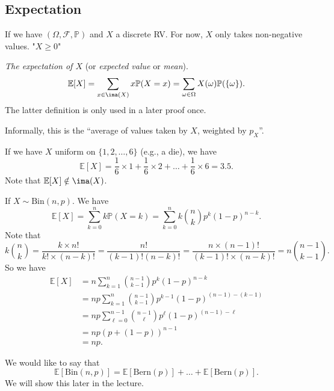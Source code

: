 \subsection{Expectation}
If we have \((\Omega, \mathcal{F}, \mathbb{P})\) and \(X\) a discrete RV. For now, \(X\) only takes non-negative values. "\(X\geq 0\)"
\begin{definition}{}{}
    \textit{The expectation of \(X\)} (or \textit{expected value} or \textit{mean}).
    \[
        \mathbb{E}[X] = \sum_{x\in \ima(X)} x \mathbb{P}(X = x) = \sum_{\omega \in\Omega}X(\omega)\mathbb{P}(\{\omega\}).
    \]
    The latter definition is only used in a later proof once.
\end{definition}
\begin{remark}
    Informally, this is the ``average of values taken by \(X\), weighted by \(p_X\)''.
\end{remark}
\begin{example}
    If we have \(X\) uniform on \(\{1, 2, \dots, 6\}\) (e.g., a die), we have
    \[
        \mathbb{E}[X] = \frac{1}{6}\times 1 + \frac{1}{6} \times 2 + \dots + \frac{1}{6} \times 6 = 3.5.
    \]
    Note that \(\mathbb{E}[X] \notin \ima(X)\).
\end{example}
\begin{example}
    If \(X \sim \mathrm{Bin}(n,p)\). We have
    \[
        \mathbb{E}[X] = \sum_{k=0}^{n} k \mathbb{P}(X = k) = \sum_{k=0}^{n} k\binom{n}{k}p^k(1-p)^{n-k}.
    \]
    Note that
    \[
        k\binom{n}{k}= \frac{k \times n!}{k! \times (n - k)!} = \frac{n!}{(k-1)!(n-k)!} = \frac{n \times (n - 1)!}{(k-1)! \times (n-k)!} = n \binom{n-1}{k-1}.
    \]
    So we have
    \begin{align*}
        \mathbb{E}[X] &= n \sum_{k=1}^{n} \binom{n - 1}{k - 1} p^k (1-p)^{n - k}\\
        & = np \sum_{k=1}^{n} \binom{n - 1}{k - 1} p^{k-1}(1-p)^{(n - 1) - (k -1)}\\
        & = np \sum_{\ell=0}^{n - 1} \binom{n - 1}{\ell}p^\ell (1 - p)^{(n - 1) - \ell}\\
        & = np (p + (1 - p))^{n - 1}\\
        & = np.
    \end{align*}
    \begin{note}
        We would like to say that
        \[
            \mathbb{E}[\mathrm{Bin}(n, p)] = \mathbb{E}[\mathrm{Bern}(p)] + \dots + \mathbb{E}[\mathrm{Bern}(p)].
        \]
        We will show this later in the lecture.
    \end{note}
\end{example}
